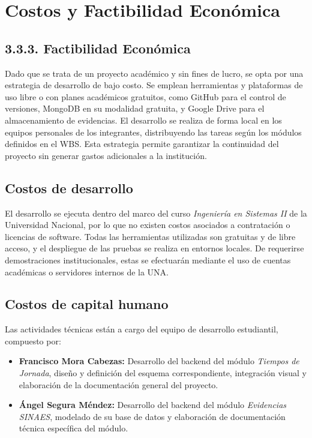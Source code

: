 \chapter{Costos y Factibilidad Económica}

\section{3.3.3. Factibilidad Económica}
Dado que se trata de un proyecto académico y sin fines de lucro, se opta por una estrategia de desarrollo de bajo costo. 
Se emplean herramientas y plataformas de uso libre o con planes académicos gratuitos, como GitHub para el control de versiones, MongoDB en su modalidad gratuita, y Google Drive para el almacenamiento de evidencias. 
El desarrollo se realiza de forma local en los equipos personales de los integrantes, distribuyendo las tareas según los módulos definidos en el WBS. 
Esta estrategia permite garantizar la continuidad del proyecto sin generar gastos adicionales a la institución.

\section{Costos de desarrollo}
El desarrollo se ejecuta dentro del marco del curso \textit{Ingeniería en Sistemas II} de la Universidad Nacional, 
por lo que no existen costos asociados a contratación o licencias de software. 
Todas las herramientas utilizadas son gratuitas y de libre acceso, y el despliegue de las pruebas se realiza en entornos locales. 
De requerirse demostraciones institucionales, estas se efectuarán mediante el uso de cuentas académicas o servidores internos de la UNA.

\section{Costos de capital humano}
Las actividades técnicas están a cargo del equipo de desarrollo estudiantil, compuesto por:

\begin{itemize}
  \item \textbf{Francisco Mora Cabezas:} Desarrollo del backend del módulo \textit{Tiempos de Jornada}, diseño y definición del esquema correspondiente, integración visual y elaboración de la documentación general del proyecto.
  \item \textbf{Ángel Segura Méndez:} Desarrollo del backend del módulo \textit{Evidencias SINAES}, modelado de su base de datos y elaboración de documentación técnica específica del módulo.
\end{itemize}

